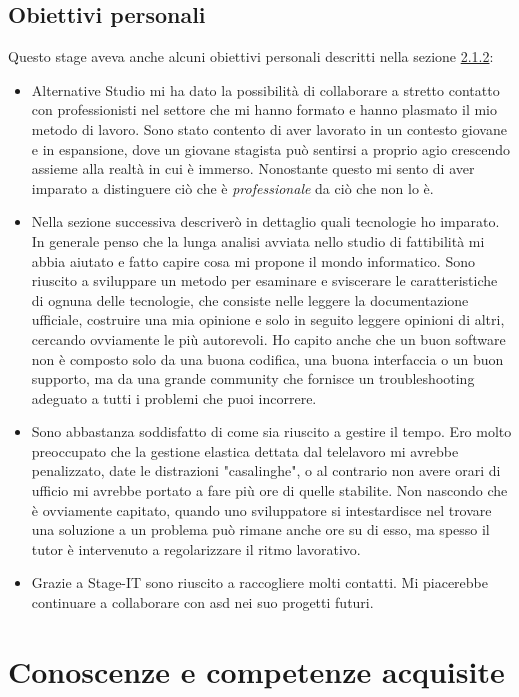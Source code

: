\subsection{Obiettivi personali}
Questo stage aveva anche alcuni obiettivi personali descritti nella sezione \hyperref[sec:obiettivi-pers]{2.1.2}:
\begin{itemize}
    \item Alternative Studio mi ha dato la possibilità di collaborare a stretto contatto con professionisti nel settore che mi hanno formato
    e hanno plasmato il mio metodo di lavoro. Sono stato contento di aver lavorato in un contesto giovane e in espansione, dove un giovane
    stagista può sentirsi a proprio agio crescendo assieme alla realtà in cui è immerso. Nonostante questo mi sento di aver imparato a
    distinguere ciò che è \textit{professionale} da ciò che non lo è.
    \item Nella sezione successiva descriverò in dettaglio quali tecnologie ho imparato. In generale penso che la lunga analisi avviata
    nello studio di fattibilità mi abbia aiutato e fatto capire cosa mi propone il mondo informatico. Sono riuscito a sviluppare un metodo
    per esaminare e sviscerare le caratteristiche di ognuna delle tecnologie, che consiste nelle leggere la documentazione ufficiale,
    costruire una mia opinione e solo in seguito leggere opinioni di altri, cercando ovviamente le più autorevoli. Ho capito anche che un
    buon software non è composto solo da una buona codifica, una buona interfaccia o un buon supporto, ma da una grande community che
    fornisce un troubleshooting adeguato a tutti i problemi che puoi incorrere.
    \item Sono abbastanza soddisfatto di come sia riuscito a gestire il tempo. Ero molto preoccupato che la gestione elastica dettata dal
    telelavoro mi avrebbe penalizzato, date le distrazioni "casalinghe", o al contrario non avere orari di ufficio mi avrebbe portato a fare
    più ore di quelle stabilite. Non nascondo che è ovviamente capitato, quando uno sviluppatore si intestardisce nel trovare una
    soluzione a un problema può rimane anche ore su di esso, ma spesso il tutor è intervenuto a regolarizzare il ritmo lavorativo. 
    \item Grazie a Stage-IT sono riuscito a raccogliere molti contatti. Mi piacerebbe continuare a collaborare con \acrlong{asd} nei suo
    progetti futuri.
\end{itemize}

\section{Conoscenze e competenze acquisite}
